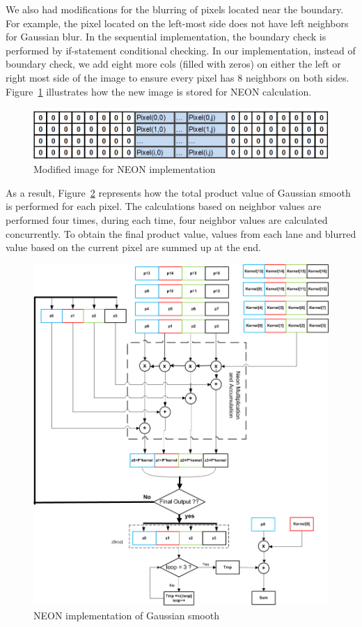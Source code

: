 We also had modifications for the blurring of pixels located near the boundary. For example, the pixel located on the left-most side does not have left neighbors for Gaussian blur. In the sequential implementation, the boundary check is performed by if-statement conditional checking. In our implementation, instead of boundary check, we add eight more cols (filled with zeros) on either the left or right most side of the image to ensure every pixel has 8 neighbors on both sides. Figure~\ref{fig:addcols} illustrates how the new image is stored for NEON calculation. 

\begin{figure}
\centering
\includegraphics[width=\linewidth]{drawings/new_cols}
\caption{Modified image for NEON implementation}
\label{fig:addcols}
\end{figure}

As a result, Figure~\ref{fig:neon} represents how the total product value of Gaussian smooth is performed for each pixel. The calculations based on neighbor values are performed four times, during each time, four neighbor values are calculated concurrently. To obtain the final product value, values from each lane and blurred value based on the current pixel are summed up at the end.

\begin{figure}
\centering
\includegraphics[width=0.75\linewidth]{drawings/neon}
\caption{NEON implementation of Gaussian smooth}
\label{fig:neon}
\end{figure}
